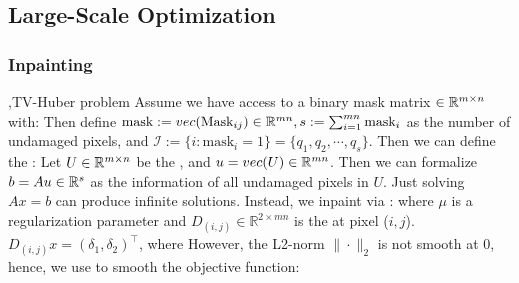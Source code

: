 \documentclass[10pt]{report}
\begin{document}
\subsection{Large-Scale Optimization}

\subsubsection{Inpainting}
\sep{TV-Huber problem}
Assume we have access to a binary mask matrix $\in \RR^{m\times n}$ with:
Then define $\text{mask}:=vec(\text{Mask}_{ij})\in\RR^{mn}, s:=\sum_{i=1}^{mn}\text{mask}_i$ as the number of undamaged pixels,
and $\mathcal{I}:=\{i:\mathrm{mask}_i=1\}=\{q_1,q_2,\cdots,q_s\}$. Then we can define the :
Let $U\in \RR^{m\times n}$ be the , and $u=vec(U)\in\RR^{mn}$. Then we can formalize $b=Au\in\RR^s$ as
the information of all undamaged pixels in $U$. Just solving $Ax=b$ can produce infinite solutions. Instead, we inpaint via :
where $\mu$ is a regularization parameter and $D_{(i,j)}\in\mathbb{R}^{2\times mn}$ is the  at pixel ($i,j$).
$D_{(i,j)}x=(\delta_1,\delta_2)^\top $, where
However, the L2-norm $\|\cdot\|_2$ is not smooth at $0$, hence, we use  to smooth the objective function:
\end{document}
